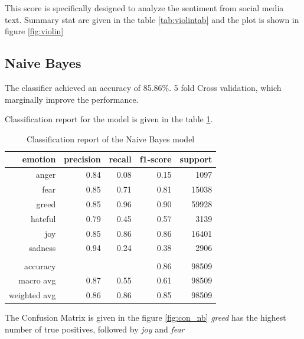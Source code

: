\documentclass[a4paper, 12pt]{article}
\begin{document}
This score is specifically designed to analyze the sentiment from social media text.
Summary stat are given in the table \ref{tab:violintab} and the plot is shown in figure \ref{fig:violin}

\subsection{Naive Bayes}
The classifier achieved an accuracy of 85.86\%. 5 fold Cross validation, which marginally improve the performance.

Classification report for the model is given in the table \ref{tab:cr2}.

\begin{table}[h]
\begin{center}
    \begin{tabular}{| r | r | r | r | r | }
        \hline
      emotion & precision & recall & f1-score & support \\ \hline
      anger    & 0.84  & 0.08     & 0.15   		& 1097    \\ \hline
			fear		& 0.85     & 0.71     & 0.81   & 15038 \\ \hline
      greed    & 0.85     & 0.96     & 0.90   & 59928 \\ \hline
      hateful    & 0.79     & 0.45     & 0.57   & 3139 \\ \hline
      joy       & 0.85   &0.86     & 0.86    & 16401 \\ \hline
      sadness    & 0.94   & 0.24     & 0.38  & 2906  \\ \hline
									 &      &        &           &     \\ \hline
      accuracy     &   			&   		 		& 0.86  &98509    \\ \hline
      macro avg     & 0.87   &0.55        & 0.61  &98509   \\ \hline
		  weighted avg & 0.86   &0.86       & 0.85   &98509  \\ \hline
    \end{tabular}
    \caption{Classification report of the Naive Bayes model}
    \label{tab:cr2}
\end{center}
\end{table}

The Confusion Matrix is given in the figure \ref{fig:con_nb}
\textit{greed} has the highest number of true positives, followed by \textit{joy} and \textit{fear}
 
\end{document}
